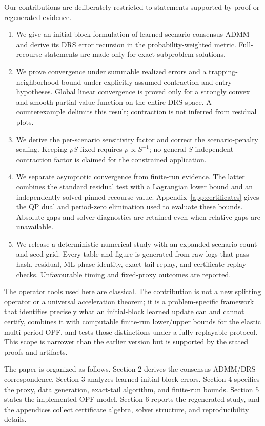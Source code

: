 \documentclass[preprint,12pt,3p]{elsarticle}
\theoremstyle{definition}
\begin{document}
Our contributions are deliberately restricted to statements supported by proof or regenerated evidence.
\begin{enumerate}
\item We give an initial-block formulation of learned scenario-consensus ADMM and derive its DRS error recursion in the probability-weighted metric. Full-recourse statements are made only for exact subproblem solutions.
\item We prove convergence under summable realized errors and a trapping-neighborhood bound under explicitly assumed contraction and entry hypotheses. Global linear convergence is proved only for a strongly convex and smooth partial value function on the entire DRS space. A counterexample delimits this result; contraction is not inferred from residual plots.
\item We derive the per-scenario sensitivity factor and correct the scenario-penalty scaling. Keeping $\rho S$ fixed requires $\rho\propto S^{-1}$; no general $S$-independent contraction factor is claimed for the constrained application.
\item We separate asymptotic convergence from finite-run evidence. The latter combines the standard residual test with a Lagrangian lower bound and an independently solved pinned-recourse value. Appendix~\ref{app:certificates} gives the QP dual and period-zero elimination used to evaluate these bounds. Absolute gaps and solver diagnostics are retained even when relative gaps are unavailable.
\item We release a deterministic numerical study with an expanded scenario-count and seed grid. Every table and figure is generated from raw logs that pass hash, residual, ML-phase identity, exact-tail replay, and certificate-replay checks. Unfavourable timing and fixed-proxy outcomes are reported.
\end{enumerate}

The operator tools used here are classical. The contribution is not a new splitting operator or a universal acceleration theorem; it is a problem-specific framework that identifies precisely what an initial-block learned update can and cannot certify, combines it with computable finite-run lower/upper bounds for the elastic multi-period OPF, and tests those distinctions under a fully replayable protocol. This scope is narrower than the earlier version but is supported by the stated proofs and artifacts.

The paper is organized as follows. Section 2 derives the consensus-ADMM/DRS correspondence. Section 3 analyzes learned initial-block errors. Section 4 specifies the proxy, data generation, exact-tail algorithm, and finite-run bounds. Section 5 states the implemented OPF model, Section 6 reports the regenerated study, and the appendices collect certificate algebra, solver structure, and reproducibility details.
\end{document}

